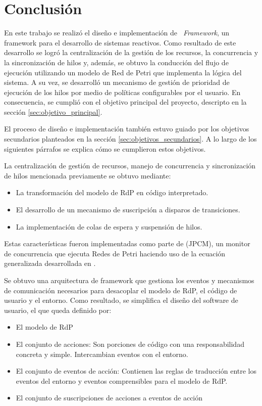 \section{Conclusión}

En este trabajo se realizó el diseño e implementación de
\textit{\nombreFramework \ Framework}, un framework para el desarrollo de
sistemas reactivos. Como resultado de este desarrollo se logró la centralización de la
gestión de los recursos, la concurrencia y la sincronización de hilos y,
además, se obtuvo la conducción del flujo de ejecución utilizando un modelo de
Red de Petri que implementa la lógica del sistema. A su vez, se desarrolló un
mecanismo de gestión de prioridad de ejecución de los hilos por medio de
políticas configurables por el usuario. En consecuencia, se cumplió con
el objetivo principal del proyecto, descripto en la sección
\ref{sec:objetivo_principal}.

El proceso de diseño e implementación también estuvo guiado por los objetivos
secundarios planteados en la sección \ref{sec:objetivos_secundarios}. A lo largo
de los siguientes párrafos se explica cómo se cumplieron estos objetivos.

La centralización de gestión de recursos, manejo de
concurrencia y sincronización de hilos mencionada previamente se obtuvo
mediante:
\begin{itemize}
 \item La transformación del modelo de RdP en código interpretado.

 \item El desarrollo de un mecanismo de suscripción a disparos de transiciones.

 \item La implementación de colas de espera y suspensión de hilos.
\end{itemize}

Estas características fueron implementadas como parte de
\javapetriconcurrencymonitor (JPCM), un monitor de concurrencia que ejecuta
Redes de Petri haciendo uso de la ecuación generalizada desarrollada en
\cite{Ecuacion_generalizada_LAC}.

Se obtuvo una arquitectura de framework que gestiona los eventos y mecanismos
de comunicación necesarios para desacoplar el modelo de RdP, el código de
usuario y el entorno.
Como resultado, se simplifica el diseño del software de usuario, el que queda
definido por:

\begin{itemize}
    \item El modelo de RdP
    \item El conjunto de acciones: Son porciones de código con una
    responsabilidad concreta y simple. Intercambian eventos con el entorno.
    \item El conjunto de eventos de acción: Contienen las reglas de traducción
    entre los eventos del entorno y eventos comprensibles para el modelo de
    RdP.
    \item El conjunto de suscripciones de acciones a eventos de acción
\end{itemize}

